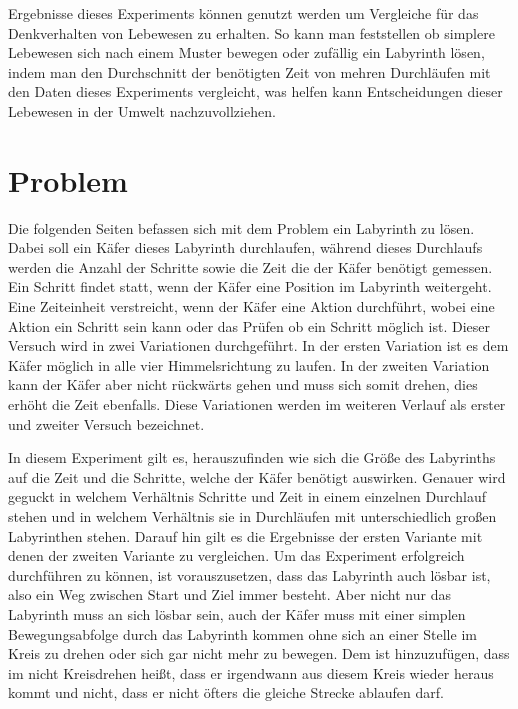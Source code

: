 \documentclass[12pt, a4paper, titlepage]{article}
\begin{document}
\bigskip

Ergebnisse dieses Experiments können genutzt werden um Vergleiche für das Denkverhalten von Lebewesen zu erhalten.
So kann man feststellen ob simplere Lebewesen sich nach einem Muster bewegen oder zufällig ein Labyrinth lösen, indem man den Durchschnitt der benötigten Zeit von mehren Durchläufen mit den Daten dieses Experiments vergleicht, was helfen kann Entscheidungen dieser Lebewesen in der Umwelt nachzuvollziehen.

\newpage

\section{Problem}

Die folgenden Seiten befassen sich mit dem Problem ein Labyrinth zu lösen.
Dabei soll ein Käfer dieses Labyrinth durchlaufen, während dieses Durchlaufs werden die Anzahl der Schritte sowie die Zeit die der Käfer benötigt gemessen.
Ein Schritt findet statt, wenn der Käfer eine Position im Labyrinth weitergeht.
Eine Zeiteinheit verstreicht, wenn der Käfer eine Aktion durchführt, wobei eine Aktion ein Schritt sein kann oder das Prüfen ob ein Schritt möglich ist.
Dieser Versuch wird in zwei Variationen durchgeführt. In der ersten Variation ist es dem Käfer möglich in alle vier Himmelsrichtung zu laufen.
In der zweiten Variation kann der Käfer aber nicht rückwärts gehen und muss sich somit drehen, dies erhöht die Zeit ebenfalls.
Diese Variationen werden im weiteren Verlauf als erster und zweiter Versuch bezeichnet.

\bigskip

In diesem Experiment gilt es, herauszufinden wie sich die Größe des Labyrinths auf die Zeit und die Schritte, welche der Käfer benötigt auswirken.
Genauer wird geguckt in welchem Verhältnis Schritte und Zeit in einem einzelnen Durchlauf stehen und in welchem Verhältnis sie in Durchläufen mit unterschiedlich großen Labyrinthen stehen.
Darauf hin gilt es die Ergebnisse der ersten Variante mit denen der zweiten Variante zu vergleichen.
Um das Experiment erfolgreich durchführen zu können, ist vorauszusetzen, dass das Labyrinth auch lösbar ist, also ein Weg zwischen Start und Ziel immer besteht.
Aber nicht nur das Labyrinth muss an sich lösbar sein, auch der Käfer muss mit einer simplen Bewegungsabfolge durch das Labyrinth kommen ohne sich an einer Stelle im Kreis zu drehen oder sich gar nicht mehr zu bewegen.
Dem ist hinzuzufügen, dass im nicht Kreisdrehen heißt, dass er irgendwann aus diesem Kreis wieder heraus kommt und nicht, dass er nicht öfters die gleiche Strecke ablaufen darf.
\end{document}

